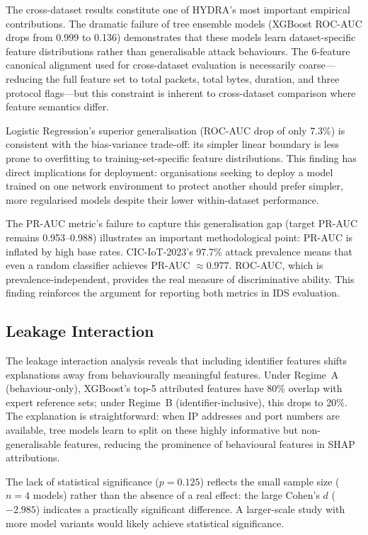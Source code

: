 \documentclass[12pt,a4paper]{report}
\begin{document}
The cross-dataset results constitute one of HYDRA's most important empirical contributions. The dramatic failure of tree ensemble models (XGBoost ROC-AUC drops from 0.999 to 0.136) demonstrates that these models learn dataset-specific feature distributions rather than generalisable attack behaviours. The 6-feature canonical alignment used for cross-dataset evaluation is necessarily coarse---reducing the full feature set to total packets, total bytes, duration, and three protocol flags---but this constraint is inherent to cross-dataset comparison where feature semantics differ.

Logistic Regression's superior generalisation (ROC-AUC drop of only 7.3\%) is consistent with the bias-variance trade-off: its simpler linear boundary is less prone to overfitting to training-set-specific feature distributions. This finding has direct implications for deployment: organisations seeking to deploy a model trained on one network environment to protect another should prefer simpler, more regularised models despite their lower within-dataset performance.

The PR-AUC metric's failure to capture this generalisation gap (target PR-AUC remains 0.953--0.988) illustrates an important methodological point: PR-AUC is inflated by high base rates. CIC-IoT-2023's 97.7\% attack prevalence means that even a random classifier achieves PR-AUC $\approx 0.977$. ROC-AUC, which is prevalence-independent, provides the real measure of discriminative ability. This finding reinforces the argument for reporting both metrics in IDS evaluation.

\subsection*{Leakage Interaction}

The leakage interaction analysis reveals that including identifier features shifts explanations away from behaviourally meaningful features. Under Regime~A (behaviour-only), XGBoost's top-5 attributed features have 80\% overlap with expert reference sets; under Regime~B (identifier-inclusive), this drops to 20\%. The explanation is straightforward: when IP addresses and port numbers are available, tree models learn to split on these highly informative but non-generalisable features, reducing the prominence of behavioural features in SHAP attributions.

The lack of statistical significance ($p = 0.125$) reflects the small sample size ($n = 4$ models) rather than the absence of a real effect: the large Cohen's $d$ ($-2.985$) indicates a practically significant difference. A larger-scale study with more model variants would likely achieve statistical significance.
\end{document}
